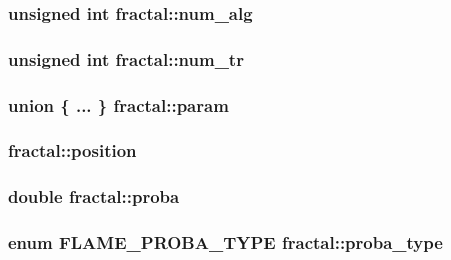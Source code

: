 \hypertarget{structfractal_ac81d19a3ae4242701ac2625d3a231f38}{
\subsubsection[{num\-\_\-alg}]{\setlength{\rightskip}{0pt plus 5cm}unsigned int {\bf fractal\-::num\-\_\-alg}}}\label{structfractal_ac81d19a3ae4242701ac2625d3a231f38}
\hypertarget{structfractal_aba2914c84dcc1a96c49e4b91aade9d7f}{
\subsubsection[{num\-\_\-tr}]{\setlength{\rightskip}{0pt plus 5cm}unsigned int {\bf fractal\-::num\-\_\-tr}}}\label{structfractal_aba2914c84dcc1a96c49e4b91aade9d7f}
\hypertarget{structfractal_aaf3b25a8725d05106ece6bc318fb8620}{
\subsubsection[{param}]{\setlength{\rightskip}{0pt plus 5cm}union \{ ... \}   {\bf fractal\-::param}}}\label{structfractal_aaf3b25a8725d05106ece6bc318fb8620}
\hypertarget{structfractal_a272b847ecd0537826d7ecb8e9ca3e4d5}{
\subsubsection[{position}]{ {\bf fractal\-::position}}}\label{structfractal_a272b847ecd0537826d7ecb8e9ca3e4d5}
\hypertarget{structfractal_a1de23626083977b508881c41a4122b4e}{
\subsubsection[{proba}]{\setlength{\rightskip}{0pt plus 5cm}double {\bf fractal\-::proba}}}\label{structfractal_a1de23626083977b508881c41a4122b4e}
\hypertarget{structfractal_a9b098f5eee05e57395a2f389b76c5fd2}{
\subsubsection[{proba\-\_\-type}]{\setlength{\rightskip}{0pt plus 5cm}enum {\bf \-F\-L\-A\-M\-E\-\_\-\-P\-R\-O\-B\-A\-\_\-\-T\-Y\-P\-E} {\bf fractal\-::proba\-\_\-type}}}\label{structfractal_a9b098f5eee05e57395a2f389b76c5fd2}
